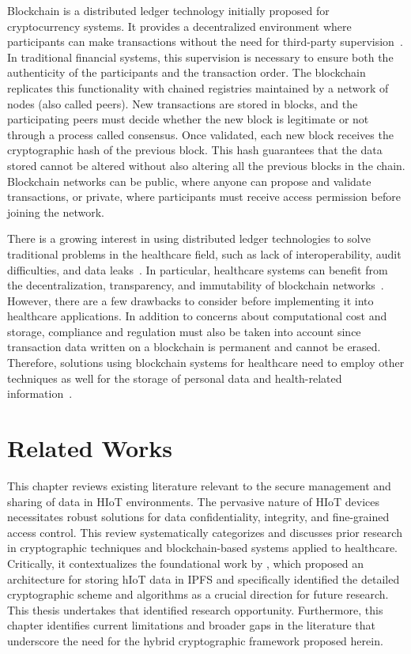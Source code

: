 \documentclass[cic,tc,english]{iiufrgs}
\numberwithin{algorithm}{chapter}
\begin{document}
        Blockchain is a distributed ledger technology initially proposed for cryptocurrency systems. It provides a decentralized environment where participants can make transactions without the need for third-party supervision~\cite{abou2019blockchain}. In traditional financial systems, this supervision is necessary to ensure both the authenticity of the participants and the transaction order. The blockchain replicates this functionality with chained registries maintained by a network of nodes (also called peers). New transactions are stored in blocks, and the participating peers must decide whether the new block is legitimate or not through a process called consensus. Once validated, each new block receives the cryptographic hash of the previous block. This hash guarantees that the data stored cannot be altered without also altering all the previous blocks in the chain. Blockchain networks can be public, where anyone can propose and validate transactions, or private, where participants must receive access permission before joining the network. 
        
        There is a growing interest in using distributed ledger technologies to solve traditional problems in the healthcare field, such as lack of interoperability, audit difficulties, and data leaks~\cite{santos2021towards}. In particular, healthcare systems can benefit from the decentralization, transparency, and immutability of blockchain networks~\cite{Arbabi2023}. However, there are a few drawbacks to consider before implementing it into healthcare applications. In addition to concerns about computational cost and storage, compliance and regulation must also be taken into account since transaction data written on a blockchain is permanent and cannot be erased. Therefore, solutions using blockchain systems for healthcare need to employ other techniques as well for the storage of personal data and health-related information~\cite{minicurso-sbcas}.


\chapter{Related Works}
    \label{chap:relatedworks}

    This chapter reviews existing literature relevant to the secure management and sharing of data in HIoT environments. The pervasive nature of HIoT devices necessitates robust solutions for data confidentiality, integrity, and fine-grained access control. This review systematically categorizes and discusses prior research in cryptographic techniques and blockchain-based systems applied to healthcare. Critically, it contextualizes the foundational work by \citet{laura2023}, which proposed an architecture for storing hIoT data in IPFS and specifically identified the detailed cryptographic scheme and algorithms as a crucial direction for future research. This thesis undertakes that identified research opportunity. Furthermore, this chapter identifies current limitations and broader gaps in the literature that underscore the need for the hybrid cryptographic framework proposed herein.
\end{document}
